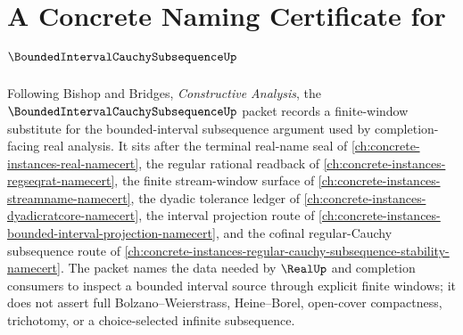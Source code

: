\chapter{A Concrete Naming Certificate for $\BoundedIntervalCauchySubsequenceUp$}
\label{ch:concrete-instances-bounded-interval-cauchy-subsequence-namecert}

Following Bishop and Bridges, \emph{Constructive Analysis}, the $\BoundedIntervalCauchySubsequenceUp$ packet records a finite-window substitute for the bounded-interval subsequence argument used by completion-facing real analysis. It sits after the terminal real-name seal of \autoref{ch:concrete-instances-real-namecert}, the regular rational readback of \autoref{ch:concrete-instances-regseqrat-namecert}, the finite stream-window surface of \autoref{ch:concrete-instances-streamname-namecert}, the dyadic tolerance ledger of \autoref{ch:concrete-instances-dyadicratcore-namecert}, the interval projection route of \autoref{ch:concrete-instances-bounded-interval-projection-namecert}, and the cofinal regular-Cauchy subsequence route of \autoref{ch:concrete-instances-regular-cauchy-subsequence-stability-namecert}. The packet names the data needed by $\RealUp$ and completion consumers to inspect a bounded interval source through explicit finite windows; it does not assert full Bolzano--Weierstrass, Heine--Borel, open-cover compactness, trichotomy, or a choice-selected infinite subsequence.

